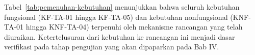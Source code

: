 Tabel~\ref{tab:pemenuhan-kebutuhan} menunjukkan bahwa seluruh kebutuhan fungsional (KF-TA-01 hingga KF-TA-05) dan kebutuhan nonfungsional (KNF-TA-01 hingga KNF-TA-04) terpenuhi oleh mekanisme rancangan yang telah diuraikan. Ketertelusuran dari kebutuhan ke rancangan ini menjadi dasar verifikasi pada tahap pengujian yang akan dipaparkan pada Bab IV.
